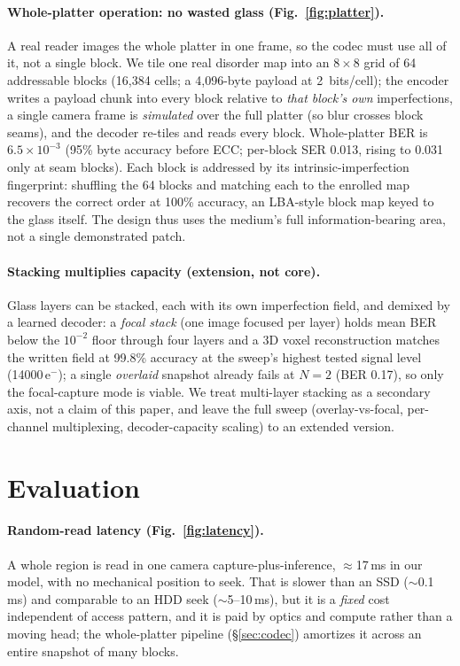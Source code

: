 \documentclass[letterpaper,twocolumn,10pt]{article}
\begin{document}
\paragraph{Whole-platter operation: no wasted glass (Fig.~\ref{fig:platter}).} A real
reader images the whole platter in one frame, so the codec must use all of it, not a
single block. We tile one real disorder map into an
$8\times8$ grid of 64 addressable blocks (16{,}384 cells; a 4{,}096-byte payload at
2~bits/cell); the encoder writes a payload chunk into every block relative to \emph{that
block's own} imperfections, a single camera frame is \emph{simulated} over the full
platter (so blur crosses block seams), and the decoder re-tiles and reads every block. Whole-platter BER is
$6.5\times10^{-3}$ (95\% byte accuracy before ECC; per-block SER 0.013, rising to 0.031
only at seam blocks). Each block is addressed by its intrinsic-imperfection fingerprint:
shuffling the 64 blocks and matching each to the enrolled map recovers the correct order
at 100\% accuracy, an LBA-style block map keyed to the glass itself. The design thus
uses the medium's full information-bearing area, not a single demonstrated patch.

\paragraph{Stacking multiplies capacity (extension, not core).} Glass layers can
be stacked, each with its own imperfection field, and demixed by a learned decoder: a
\emph{focal stack} (one image focused per layer) holds mean BER below the $10^{-2}$
floor through four layers and a 3D voxel reconstruction matches the written field at
99.8\% accuracy at the sweep's highest tested signal level (14000\,e$^-$); a single
\emph{overlaid} snapshot already fails at $N{=}2$ (BER 0.17), so only the focal-capture
mode is viable. We treat multi-layer stacking as a secondary axis, not a claim of this
paper, and leave the full sweep (overlay-vs-focal, per-channel multiplexing,
decoder-capacity scaling) to an extended version.

\section{Evaluation}
\label{sec:eval}
\paragraph{Random-read latency (Fig.~\ref{fig:latency}).} A whole region is read in one
camera capture-plus-inference, $\approx$17\,ms in our model, with no mechanical position to
seek. That is slower than an SSD ($\sim$0.1\,ms) and comparable to an HDD seek
($\sim$5--10\,ms), but it is a \emph{fixed} cost independent of access pattern, and it is
paid by optics and compute rather than a moving head; the whole-platter pipeline
(\S\ref{sec:codec}) amortizes it across an entire snapshot of many blocks.
\end{document}
